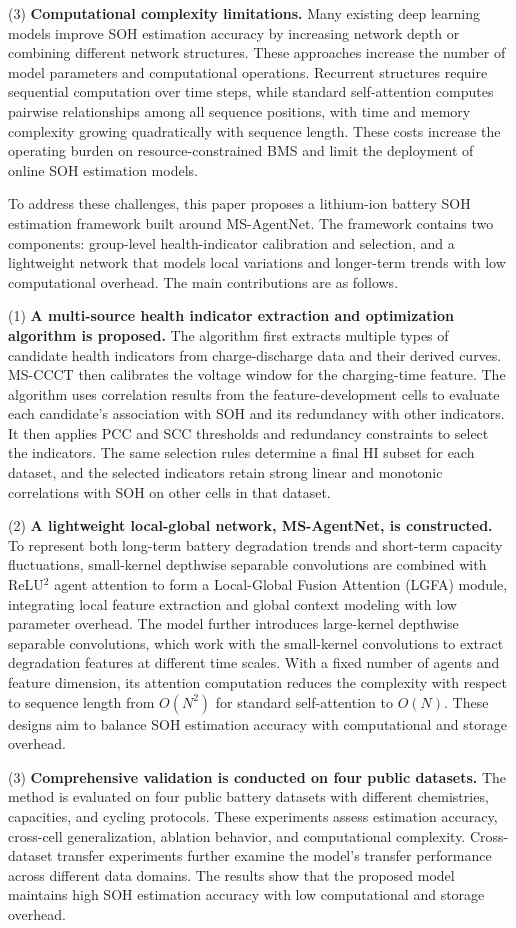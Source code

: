 (3) \textbf{Computational complexity limitations.} Many existing deep learning models improve SOH estimation accuracy by increasing network depth or combining different network structures. These approaches increase the number of model parameters and computational operations. Recurrent structures require sequential computation over time steps, while standard self-attention computes pairwise relationships among all sequence positions, with time and memory complexity growing quadratically with sequence length. These costs increase the operating burden on resource-constrained BMS and limit the deployment of online SOH estimation models.

To address these challenges, this paper proposes a lithium-ion battery SOH estimation framework built around MS-AgentNet. The framework contains two components: group-level health-indicator calibration and selection, and a lightweight network that models local variations and longer-term trends with low computational overhead. The main contributions are as follows.

(1) \textbf{A multi-source health indicator extraction and optimization algorithm is proposed.} The algorithm first extracts multiple types of candidate health indicators from charge-discharge data and their derived curves. MS-CCCT then calibrates the voltage window for the charging-time feature. The algorithm uses correlation results from the feature-development cells to evaluate each candidate's association with SOH and its redundancy with other indicators. It then applies PCC and SCC thresholds and redundancy constraints to select the indicators. The same selection rules determine a final HI subset for each dataset, and the selected indicators retain strong linear and monotonic correlations with SOH on other cells in that dataset.

(2) \textbf{A lightweight local-global network, MS-AgentNet, is constructed.} To represent both long-term battery degradation trends and short-term capacity fluctuations, small-kernel depthwise separable convolutions are combined with ReLU$^2$ agent attention to form a Local-Global Fusion Attention (LGFA) module, integrating local feature extraction and global context modeling with low parameter overhead. The model further introduces large-kernel depthwise separable convolutions, which work with the small-kernel convolutions to extract degradation features at different time scales. With a fixed number of agents and feature dimension, its attention computation reduces the complexity with respect to sequence length from $O(N^2)$ for standard self-attention to $O(N)$. These designs aim to balance SOH estimation accuracy with computational and storage overhead.

(3) \textbf{Comprehensive validation is conducted on four public datasets.} The method is evaluated on four public battery datasets with different chemistries, capacities, and cycling protocols. These experiments assess estimation accuracy, cross-cell generalization, ablation behavior, and computational complexity. Cross-dataset transfer experiments further examine the model's transfer performance across different data domains. The results show that the proposed model maintains high SOH estimation accuracy with low computational and storage overhead.
